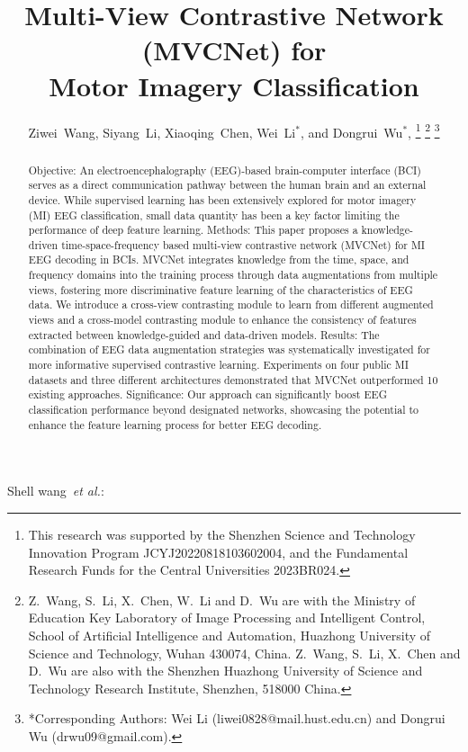 \documentclass[journal]{IEEEtran}
\begin{document}
\title{Multi-View Contrastive Network (MVCNet) for \\ Motor Imagery Classification}

\author{Ziwei~Wang, Siyang~Li, Xiaoqing~Chen, Wei~Li$^{\ast}$, and Dongrui~Wu$^{\ast}$, 
\thanks{This research was supported by the Shenzhen Science and Technology Innovation Program JCYJ20220818103602004, and the Fundamental Research Funds for the Central Universities 2023BR024.}
\thanks{Z.~Wang, S.~Li, X.~Chen, W.~Li and D.~Wu are with the Ministry of Education Key Laboratory of Image Processing and Intelligent Control, School of Artificial Intelligence and Automation, Huazhong University of Science and Technology, Wuhan 430074, China. Z.~Wang, S.~Li, X.~Chen and D.~Wu are also with the Shenzhen Huazhong University of Science and Technology Research Institute, Shenzhen, 518000 China.}
\thanks{*Corresponding Authors: Wei Li (liwei0828@mail.hust.edu.cn) and Dongrui Wu (drwu09@gmail.com).}}

{Shell \MakeLowercase{Wang~\emph{et al.}}: }
\maketitle

\begin{abstract}
Objective: An electroencephalography (EEG)-based brain-computer interface (BCI) serves as a direct communication pathway between the human brain and an external device. While supervised learning has been extensively explored for motor imagery (MI) EEG classification, small data quantity has been a key factor limiting the performance of deep feature learning. Methods: This paper proposes a knowledge-driven time-space-frequency based multi-view contrastive network (MVCNet) for MI EEG decoding in BCIs. MVCNet integrates knowledge from the time, space, and frequency domains into the training process through data augmentations from multiple views, fostering more discriminative feature learning of the characteristics of EEG data. We introduce a cross-view contrasting module to learn from different augmented views and a cross-model contrasting module to enhance the consistency of features extracted between knowledge-guided and data-driven models. Results: The combination of EEG data augmentation strategies was systematically investigated for more informative supervised contrastive learning. Experiments on four public MI datasets and three different architectures demonstrated that MVCNet outperformed 10 existing approaches. Significance: Our approach can significantly boost EEG classification performance beyond designated networks, showcasing the potential to enhance the feature learning process for better EEG decoding.
\end{abstract}
\end{document}
